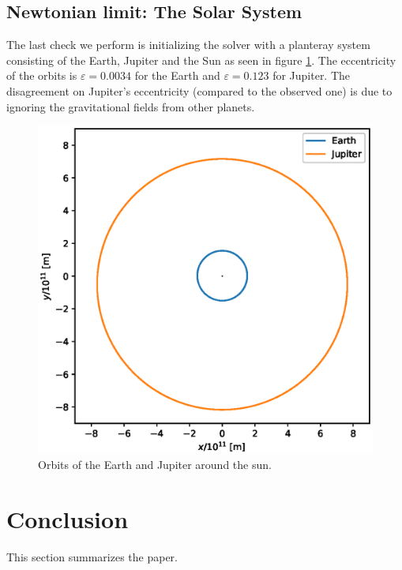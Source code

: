 \documentclass[journal, a4paper]{IEEEtran}
\begin{document}
\subsection{Newtonian limit: The Solar System}
The last check we perform is initializing the solver with a planteray system consisting of the Earth, Jupiter and the Sun as seen in figure \ref{fig::solarsystem}. The eccentricity of the orbits is $\varepsilon = 0.0034$ for the Earth and $\varepsilon=0.123$ for Jupiter. The disagreement on Jupiter's eccentricity (compared to the observed one) is due to ignoring the gravitational fields from other planets. 
\begin{figure}[!hbt]
	\begin{center}
	\includegraphics[width=\columnwidth]{SolarSystem.eps}
	\caption{Orbits of the Earth and Jupiter around the sun.}
	\label{fig::solarsystem}
\end{center}
\end{figure}
\section{Conclusion}
	This section summarizes the paper.
\end{document}
